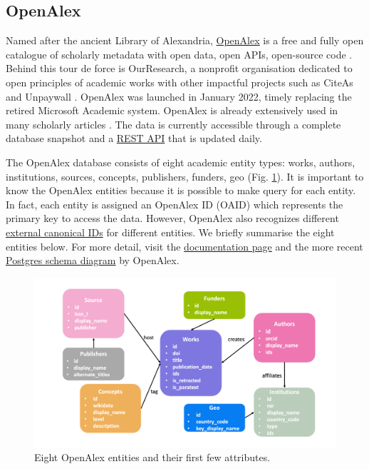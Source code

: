 \subsection{OpenAlex}
Named after the ancient Library of Alexandria, \href{http://docs.openalex.org}{OpenAlex} is a free and fully open catalogue of scholarly metadata with open data, open APIs, open-source code \citep{priem2022openalex}.
Behind this tour de force is OurResearch, a nonprofit organisation dedicated to open principles of academic works with other impactful projects such as CiteAs \citep{du2021citeas} and Unpaywall \citep{chawla2017unpaywall}.
OpenAlex was launched in January 2022, timely replacing the retired Microsoft Academic system. OpenAlex is already extensively used in many scholarly articles \citep{belfiore2022characterising}. 
The data is currently accessible through a complete database snapshot and a \href{https://en.wikipedia.org/wiki/Representational_state_transfer#Applied_to_web_services}{REST API} that is updated daily.

The OpenAlex database consists of eight academic entity types: works, authors, institutions, sources, concepts, publishers, funders, geo (Fig. \ref{oa-metagraph}). It is important to know the OpenAlex entities because it is possible to make query for each entity. In fact, each entity is assigned an OpenAlex ID (OAID) which represents the primary key to access the data. 
However, OpenAlex also recognizes different \href{https://docs.openalex.org/how-to-use-the-api/get-single-entities#canonical-external-ids}{external canonical IDs} for different entities.
We briefly summarise the eight entities below.
For more detail, visit the \href{http://docs.openalex.org/}{documentation page} and the more recent \href{https://docs.openalex.org/download-all-data/upload-to-your-database/load-to-a-relational-database/postgres-schema-diagram}{Postgres schema diagram} by OpenAlex.

\begin{figure}[htbp]
  \centering
  \includegraphics[scale=0.40]{figures/oa-metagraph}
  \caption{Eight OpenAlex entities and their first few attributes.}
  \label{oa-metagraph}
\end{figure}

